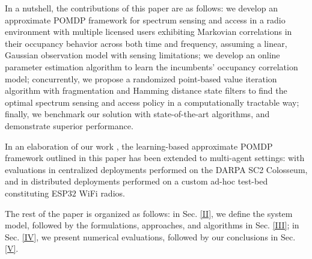 \documentclass[10pt,twocolumn]{IEEEtran}
\begin{document}
 In a nutshell, the contributions of this paper are as follows:
we develop an approximate POMDP framework for spectrum sensing and access in a radio environment with multiple licensed users exhibiting Markovian correlations in their occupancy behavior across both time and frequency, assuming a linear, Gaussian observation model with sensing limitations; we develop an online parameter estimation algorithm to learn the incumbents' occupancy correlation model; concurrently, we propose a randomized point-based value iteration algorithm with fragmentation and Hamming distance state filters to find the optimal spectrum sensing and access policy in a computationally tractable way; finally, we benchmark our solution with state-of-the-art algorithms, and demonstrate superior performance. 

 In an elaboration of our work \cite{TCCN:paper}, the learning-based approximate POMDP framework outlined in this paper has been extended to multi-agent settings: with evaluations in centralized deployments performed on the DARPA SC2 Colosseum, and in distributed deployments performed on a custom ad-hoc test-bed constituting ESP$32$ WiFi radios.

The rest of the paper is organized as follows: in Sec. \ref{II}, we define the system model, followed by the formulations, approaches, and algorithms in Sec. \ref{III}; in Sec. \ref{IV}, we present numerical evaluations, followed by our conclusions in Sec. \ref{V}.
\vspace{-8mm}
\end{document}
